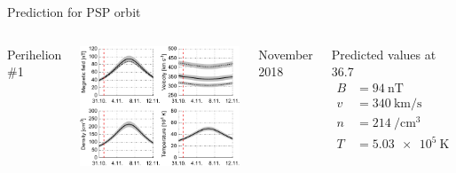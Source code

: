 \begin{frame}[plain,c]{Prediction for PSP orbit}{}
	\begin{columns}[c]
		
		\centering
		Perihelion \#1\\\ 
		
		\includegraphics[width=\textwidth]{../talk_figures/SPP_perihelia_prediction_f_defense.pdf}
		
		November 2018

		
		\begin{block}{\centering Predicted values at 36.7~\Rs}
			\begin{align*}
				B &= \SI{94}{\nano\tesla}\\
				v &= \SI{340}{\km\per\s}\\
				n &= \SI{214}{\per\cm\cubed}\\
				T &= \SI{5.03e5}{\kelvin}
			\end{align*}
		\end{block}
	
	\end{columns}
\end{frame}
